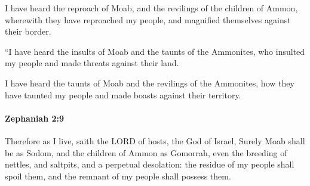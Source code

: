 			\begin{versebox}
					\item[BHS] 
					\item[LXX] 
					\item[ASV] I have heard the reproach of Moab, and the revilings of the children of Ammon, wherewith they have reproached my people, and magnified themselves against their border.
					\item[NIV] “I have heard the insults of Moab and the taunts of the Ammonites, who insulted my people and made threats against their land.
					\item[NRSV] I have heard the taunts of Moab and the revilings of the Ammonites, how they have taunted my people and made boasts against their territory.
			\end{versebox}

		\paragraph{Zephaniah 2:9} %
			\label{ZEPHANIAH-2-9}

			Therefore as I live, saith the LORD of hosts, the God of Israel, Surely Moab shall be as Sodom, and the children of Ammon as Gomorrah, even the breeding of nettles, and saltpits, and a perpetual desolation: the residue of my people shall spoil them, and the remnant of my people shall possess them.

